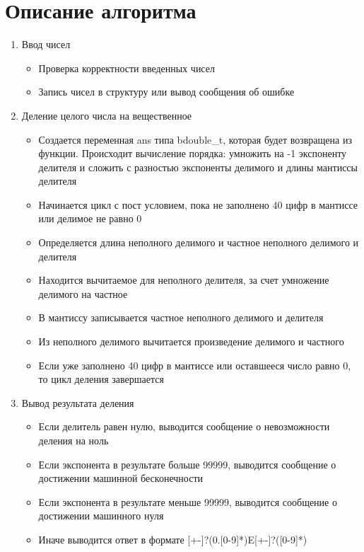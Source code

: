 \section{Описание алгоритма}
\begin{enumerate}
	\item Ввод чисел
	\begin{itemize}
		\item Проверка корректности введенных чисел
		\item Запись чисел в структуру или вывод сообщения об ошибке
	\end{itemize}
	\item Деление целого числа на вещественное
	\begin{itemize}
		\item Создается переменная ans типа bdouble\_t, которая будет возвращена из функции. Происходит вычисление порядка: умножить на -1 экспоненту делителя и сложить с разностью экспоненты делимого и длины мантиссы делителя
		\item Начинается цикл с пост условием, пока не заполнено 40 цифр в мантиссе или делимое не равно 0
		\item Определяется длина неполного делимого и частное неполного делимого и делителя
		\item Находится вычитаемое для неполного делителя, за счет умножение делимого на частное 
		\item В мантиссу записывается частное неполного делимого и делителя 
		\item Из неполного делимого вычитается произведение делимого и частного
		\item Если уже заполнено 40 цифр в мантиссе или оставшееся число равно 0, то цикл деления завершается
	\end{itemize}
	\item Вывод результата деления
	\begin{itemize}
		\item Если делитель равен нулю, выводится сообщение о невозможности деления на ноль
		\item Если экспонента в результате больше 99999, выводится сообщение о достижении машинной бесконечности
		\item  Если экспонента в результате меньше 99999, выводится сообщение о достижении машинного нуля
		\item Иначе выводится ответ в формате [+-]?(0.[0-9]*)E[+-]?([0-9]*)
	\end{itemize}
\end{enumerate}

